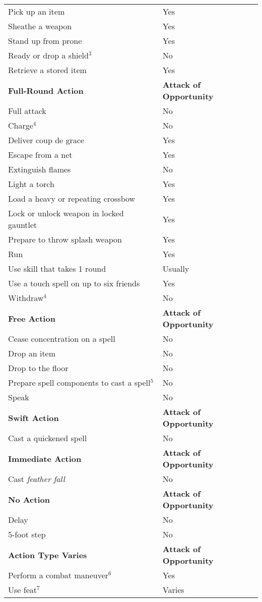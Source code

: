 \begin{table}[]
\begin{tabular}{ll}
Pick up an item & Yes\\
Sheathe a weapon & Yes\\
Stand up from prone & Yes\\
Ready or drop a shield\(^{3}\) & No\\
Retrieve a stored item & Yes\\
\textbf{Full-Round Action} & \textbf{Attack of Opportunity}\\
Full attack & No\\
Charge\(^{4}\) & No\\
Deliver coup de grace & Yes\\
Escape from a net & Yes\\
Extinguish flames & No\\
Light a torch & Yes\\
Load a heavy or repeating crossbow & Yes\\
Lock or unlock weapon in locked gauntlet & Yes\\
Prepare to throw splash weapon & Yes\\
Run & Yes\\
Use skill that takes 1 round & Usually\\
Use a touch spell on up to six friends & Yes\\
Withdraw\(^{4}\) & No\\
\textbf{Free Action} & \textbf{Attack of Opportunity}\\
Cease concentration on a spell & No\\
Drop an item & No\\
Drop to the floor & No\\
Prepare spell components to cast a spell\(^{5}\) & No\\
Speak & No\\
\textbf{Swift Action} & \textbf{Attack of Opportunity}\\
Cast a quickened spell & No\\
\textbf{Immediate Action} & \textbf{Attack of Opportunity}\\
Cast \textit{feather fall} & No\\
\textbf{No Action} &  \textbf{Attack of Opportunity}\\
Delay & No\\
5-foot step & No\\
\textbf{Action Type Varies} & \textbf{Attack of Opportunity}\\
Perform a combat maneuver\(^{6}\) & Yes\\
Use feat\(^{7}\) & Varies\\

\end{tabular}
\end{table}
